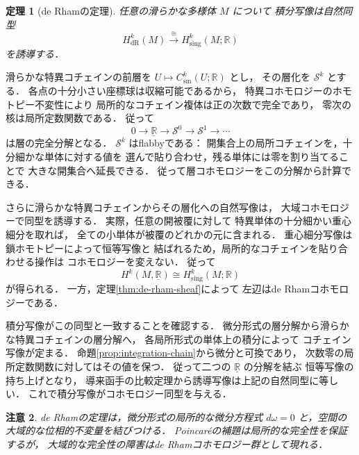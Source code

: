 \documentclass[a5paper,10pt,onecolumn]{jsarticle}
\makeatletter
\theoremstyle{mathnotetheorem}
\newtheorem{theorem}{定理}[section]
\newtheorem{remark}[theorem]{注意}
\renewcommand{\proofname}{証明}
\renewenvironment{proof}[1][\proofname]{%
  \par\pushQED{\qed}\normalfont\topsep4\p@\@plus2\p@\relax
  \trivlist\item[\hskip\labelsep\bfseries #1]\ignorespaces
}{\popQED\endtrivlist\@endpefalse}
\makeatother
\begin{document}
\begin{theorem}[de Rhamの定理]\label{thm:de-rham}
任意の滑らかな多様体 $M$ について
積分写像は自然同型
\[
 H_{\mathrm{dR}}^k(M)\xrightarrow{\ \cong\ }
 H_{\mathrm{sing}}^k(M;\mathbb R)
\]
を誘導する．
\end{theorem}
\begin{proof}
滑らかな特異コチェインの前層を
$U\mapsto C^k_{\mathrm{sm}}(U;\mathbb R)$ とし，
その層化を $\mathcal S^k$ とする．
各点の十分小さい座標球は収縮可能であるから，
特異コホモロジーのホモトピー不変性により
局所的なコチェイン複体は正の次数で完全であり，
零次の核は局所定数関数である．
従って
\[
 0\to\underline{\mathbb R}\to
 \mathcal S^0\to\mathcal S^1\to\cdots
\]
は層の完全分解となる．
$\mathcal S^k$ はflabbyである：
開集合上の局所コチェインを，十分細かな単体に対する値を
選んで貼り合わせ，残る単体には零を割り当てることで
大きな開集合へ延長できる．
従って層コホモロジーをこの分解から計算できる．

さらに滑らかな特異コチェインからその層化への自然写像は，
大域コホモロジーで同型を誘導する．
実際，任意の開被覆に対して
特異単体の十分細かい重心細分を取れば，
全ての小単体が被覆のどれかの元に含まれる．
重心細分写像は鎖ホモトピーによって恒等写像と
結ばれるため，局所的なコチェインを貼り合わせる操作は
コホモロジーを変えない．
従って
\[
 H^k(M,\underline{\mathbb R})
 \cong H_{\mathrm{sing}}^k(M;\mathbb R)
\]
が得られる．
一方，定理\ref{thm:de-rham-sheaf}によって
左辺はde Rhamコホモロジーである．

積分写像がこの同型と一致することを確認する．
微分形式の層分解から滑らかな特異コチェインの層分解へ，
各局所形式の単体上の積分によって
コチェイン写像が定まる．
命題\ref{prop:integration-chain}から微分と可換であり，
次数零の局所定数関数に対してはその値を保つ．
従って二つの $\underline{\mathbb R}$ の分解を結ぶ
恒等写像の持ち上げとなり，
導来函手の比較定理から誘導写像は上記の自然同型に等しい．
これで積分写像がコホモロジー同型を与える．
\end{proof}

\begin{remark}
de Rhamの定理は，微分形式の局所的な微分方程式
$d\omega=0$ と，空間の大域的な位相的不変量を結びつける．
Poincar\'eの補題は局所的な完全性を保証するが，
大域的な完全性の障害はde Rhamコホモロジー群として現れる．
\end{remark}
\end{document}
